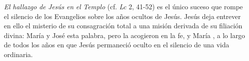 	 \emph{El hallazgo de Jesús en el Templo} (cf. \emph{Lc} 2, 41-52) es el único suceso que rompe el silencio de los Evangelios sobre los años ocultos de Jesús. Jesús deja entrever en ello el misterio de su consagración total a una misión derivada de su filiación divina:  María y José  esta palabra, pero la acogieron en la fe, y María , a lo largo de todos los años en que Jesús permaneció oculto en el silencio de una vida ordinaria.